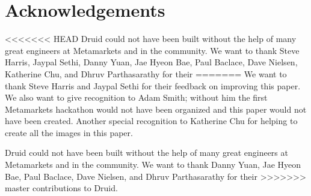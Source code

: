 \documentclass{vldb}
\begin{document}
\section{Acknowledgements}
\label{sec:acknowledgements}
<<<<<<< HEAD
Druid could not have been built without the help of many great
engineers at Metamarkets and in the community. We want to thank Steve
Harris, Jaypal Sethi, Danny Yuan, Jae Hyeon Bae, Paul Baclace, Dave
Nielsen, Katherine Chu, and Dhruv Parthasarathy for their
=======
We want to thank Steve Harris and Jaypal Sethi for their feedback on improving this paper.
We also want to give recognition to Adam Smith; without him the first Metamarkets hackathon would not have 
been organized and this paper would not have been created. Another special recognition to Katherine Chu for
helping to create all the images in this paper. 

Druid could not have been built without the help of many great
engineers at Metamarkets and in the community. We want to thank Danny Yuan, Jae Hyeon Bae, Paul Baclace, Dave
Nielsen, and Dhruv Parthasarathy for their
>>>>>>> master
contributions to Druid.




\end{document}
